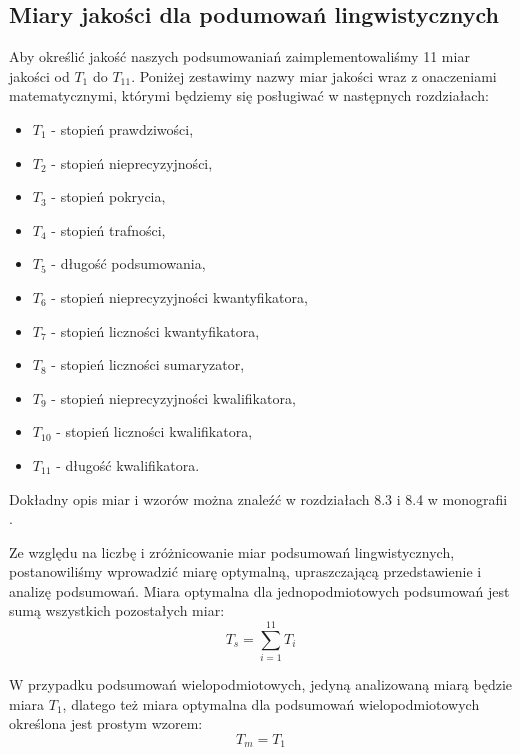 \documentclass{classrep}
\begin{document}
\subsection{Miary jakości dla podumowań lingwistycznych}

Aby określić jakość naszych podsumowaniań zaimplementowaliśmy 11 miar jakości od $T_1$ do $T_{11}$. Poniżej zestawimy nazwy miar jakości wraz z onaczeniami matematycznymi, którymi będziemy się posługiwać w następnych rozdziałach:

\begin{itemize}[label=$\bullet$\scshape\bfseries]
\item $T_1$ - stopień prawdziwości,
\item $T_2$ - stopień nieprecyzyjności,
\item $T_3$ - stopień pokrycia,
\item $T_4$ - stopień trafności,
\item $T_5$ - długość podsumowania,
\item $T_6$ - stopień nieprecyzyjności kwantyfikatora,
\item $T_7$ - stopień liczności kwantyfikatora,
\item $T_8$ - stopień liczności sumaryzator,
\item $T_9$ - stopień nieprecyzyjności kwalifikatora,
\item $T_{10}$ - stopień liczności kwalifikatora,
\item $T_{11}$ - długość kwalifikatora.
\end{itemize}

Dokładny opis miar i wzorów można znaleźć w rozdziałach 8.3 i 8.4 w monografii \cite{ksiazka}.\newline

Ze względu na liczbę i zróżnicowanie miar podsumowań lingwistycznych, postanowiliśmy wprowadzić miarę optymalną, upraszczającą przedstawienie i analizę podsumowań. Miara optymalna dla jednopodmiotowych podsumowań jest sumą wszystkich pozostałych miar:
\begin{equation}
T_s = \sum_{i=1}^{11} T_{i}
\end{equation}

W przypadku podsumowań wielopodmiotowych, jedyną analizowaną miarą będzie miara $T_1$, dlatego też miara optymalna dla podsumowań wielopodmiotowych określona jest prostym wzorem:
\begin{equation}
T_m = T_{1}
\end{equation}

\clearpage
\end{document}
